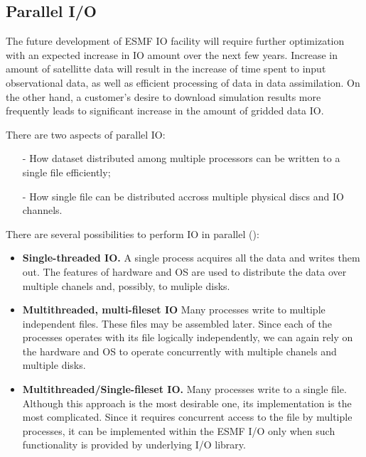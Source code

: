\subsection{Parallel I/O}

The future development of ESMF IO facility will require further
optimization with an expected increase in IO amount over the next few
years. Increase in amount of satellitte data will result in the
increase of time spent to input observational data, as well as
efficient processing of data in data assimilation. On the
other hand, a customer's desire to download simulation results more 
frequently leads to significant increase in the amount of gridded data IO.

There are two aspects of  parallel IO:

\begin{itemize}
\item[-] How dataset distributed among multiple processors can be
written to a single file efficiently;

\item[-] How single file can be distributed accross multiple physical
discs and IO channels.
\end{itemize}
 
There are several possibilities to perform IO in parallel (\cite{MPI-2}):
\begin{itemize}
\item {\bf Single-threaded IO.} A single process acquires all the data and
writes them out. The features of hardware and OS are used to distribute the 
data over multiple chanels and, possibly, to muliple disks.

\item {\bf Multithreaded, multi-fileset IO} Many processes write to
multiple independent files. These files may be assembled later. Since each of 
the processes operates with its file logically independently, we can again 
rely on the hardware and OS to operate concurrently with multiple chanels and 
multiple disks. 
 
\item {\bf Multithreaded/Single-fileset IO.} Many processes write to a
single file. Although this approach is the most desirable one, its 
implementation is the most complicated. Since it requires concurrent access 
to the file by multiple processes, it can be implemented within the ESMF I/O 
only when such functionality is provided by underlying I/O library. 
\end{itemize}

